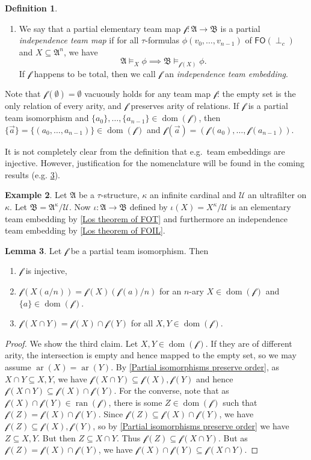 \documentclass[a4paper]{amsart}
\theoremstyle{definition}
\newtheorem{definition}{Definition}[section]
\newtheorem{lemma}[definition]{Lemma}
\newtheorem{example}[definition]{Example}
\theoremstyle{remark}
\newcommand{\A}{\mathcal{A}}
\newcommand{\B}{\mathcal{B}}
\newcommand{\U}{\mathcal{U}}
\DeclareMathOperator{\dom}{dom}
\DeclareMathOperator{\ran}{ran}
\newcommand\foil{\mathsf{FO}(\perp_c)}
\DeclareMathOperator{\ar}{ar}
\theoremstyle{definition}
\renewcommand{\A}{\mathfrak{A}}
\renewcommand{\B}{\mathfrak{B}}
\newcommand{\f}{\mathcal{f}}
\begin{document}
\begin{definition}
\begin{enumerate}
        \item We say that a partial elementary team map $\f\colon\A\to\B$ is a partial \emph{independence team map} if for all $\tau$-formulas $\phi(v_0,\dots,v_{n-1})$ of $\foil$ and $X\subseteq\A^n$, we have
        \[
            \A\models_X\phi \implies \B\models_{\f(X)}\phi.
        \]
        If $\f$ happens to be total, then we call $\f$ an \emph{independence team embedding}.
    \end{enumerate}
\end{definition}

Note that $\f(\emptyset) = \emptyset$ vacuously holds for any team map $\f$: the empty set is the only relation of every arity, and $\f$ preserves arity of relations. If $\f$ is a partial team isomorphism and $\{a_0\},\dots,\{a_{n-1}\}\in\dom(\f)$, then $\{\vec a\} = \{(a_0,\dots,a_{n-1})\}\in\dom(\f)$ and $\f(\vec a) = (\f(a_0),\dots,\f(a_{n-1}))$.

It is not completely clear from the definition that e.g.\ team embeddings are injective. However, justification for the nomenclature will be found in the coming results (e.g. \cref{lemma: partial team isomorphism properties}).

\begin{example}
    Let $\A$ be a $\tau$-structure, $\kappa$ an infinite cardinal and $\U$ an ultrafilter on $\kappa$. Let $\B = \A^\kappa/\U$. Now $\iota\colon\A\to\B$ defined by $\iota(X) = X^\kappa/\U$ is an elementary team embedding by \cref{Los theorem of FOT} and furthermore an independence team embedding by \cref{Los theorem of FOIL}.
\end{example}

\begin{lemma}\label{lemma: partial team isomorphism properties}
    Let $\f$ be a partial team isomorphism. Then
    \begin{enumerate}
        \item $\f$ is injective,
        \item $\f(X(a/n)) = \f(X)(\f(a)/n)$ for an $n$-ary $X\in\dom(\f)$ and $\{a\}\in\dom(\f)$.
        \item $\f(X\cap Y) = \f(X)\cap\f(Y)$ for all $X,Y\in\dom(\f)$.
    \end{enumerate}
\end{lemma}
\begin{proof}
    We show the third claim.
    Let $X,Y\in\dom(\f)$. If they are of different arity, the intersection is empty and hence mapped to the empty set, so we may assume $\ar(X)=\ar(Y)$. By \ref{Partial isomorphisms preserve order}, as $X\cap Y\subseteq X,Y$, we have $\f(X\cap Y)\subseteq\f(X),\f(Y)$ and hence $\f(X\cap Y)\subseteq\f(X)\cap\f(Y)$. For the converse, note that as $\f(X)\cap\f(Y)\in\ran(\f)$, there is some $Z\in\dom(\f)$ such that $\f(Z)=\f(X)\cap\f(Y)$. Since $\f(Z)\subseteq\f(X)\cap\f(Y)$, we have $\f(Z)\subseteq\f(X),\f(Y)$, so by \ref{Partial isomorphisms preserve order} we have $Z\subseteq X,Y$. But then $Z\subseteq X\cap Y$. Thus $\f(Z)\subseteq\f(X\cap Y)$. But as $\f(Z)=\f(X)\cap\f(Y)$, we have $\f(X)\cap\f(Y)\subseteq\f(X\cap Y)$.
\end{proof}
\end{document}
